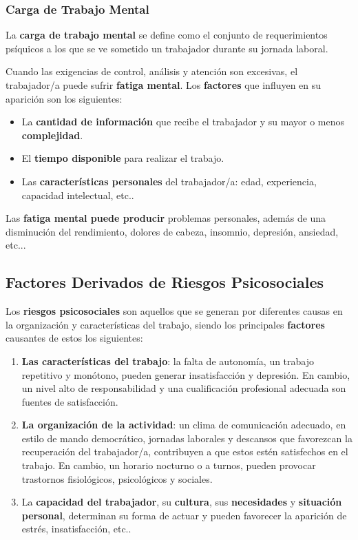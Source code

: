 \subsubsection{Carga de Trabajo Mental}
La \textbf{carga de trabajo mental} se define como el conjunto de requerimientos psíquicos a los que se ve sometido un trabajador durante su jornada laboral.

Cuando las exigencias de control, análisis y atención son excesivas, el trabajador/a puede sufrir \textbf{fatiga mental}. Los \textbf{factores} que influyen en su aparición son los siguientes:

\begin{itemize}
    \item La \textbf{cantidad de información} que recibe el trabajador y su mayor o menos \textbf{complejidad}.
    \item El \textbf{tiempo disponible} para realizar el trabajo.
    \item Las \textbf{características personales} del trabajador/a: edad, experiencia, capacidad intelectual, etc..
\end{itemize}

Las \textbf{fatiga mental puede producir} problemas personales, además de una disminución del rendimiento, dolores de cabeza, insomnio, depresión, ansiedad, etc...

\subsection{Factores Derivados de Riesgos Psicosociales}
Los \textbf{riesgos psicosociales} son aquellos que se generan por diferentes causas en la organización y características del trabajo, siendo los principales \textbf{factores} causantes de estos los siguientes:

\begin{enumerate}
    \item \textbf{Las características del trabajo}: la falta de autonomía, un trabajo repetitivo y monótono, pueden generar insatisfacción y depresión. En cambio, un nivel alto de responsabilidad y una cualificación profesional adecuada son fuentes de satisfacción.
    \item \textbf{La organización de la actividad}: un clima de comunicación adecuado, en estilo de mando democrático, jornadas laborales y descansos que favorezcan la recuperación del trabajador/a, contribuyen a que estos estén satisfechos en el trabajo. En cambio, un horario nocturno o a turnos, pueden provocar trastornos fisiológicos, psicológicos y sociales.
    \item La \textbf{capacidad del trabajador}, su \textbf{cultura}, sus \textbf{necesidades} y \textbf{situación personal}, determinan su forma de actuar y pueden favorecer la aparición de estrés, insatisfacción, etc..
\end{enumerate}

